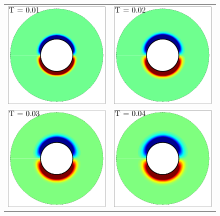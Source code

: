 \begin{figure}
\begin{center}
\begin{tabular}[t]{cc}
\includegraphics[width=6.5cm]{./Figures/results/static/vorticity_T0_01.pdf} & 
\includegraphics[width=6.5cm]{./Figures/results/static/vorticity_T0_02.pdf}  \\
\includegraphics[width=6.5cm]{./Figures/results/static/vorticity_T0_03.pdf} & 
\includegraphics[width=6.5cm]{./Figures/results/static/vorticity_T0_04.pdf} \\

\end{tabular}
\end{center}
\end{figure}
